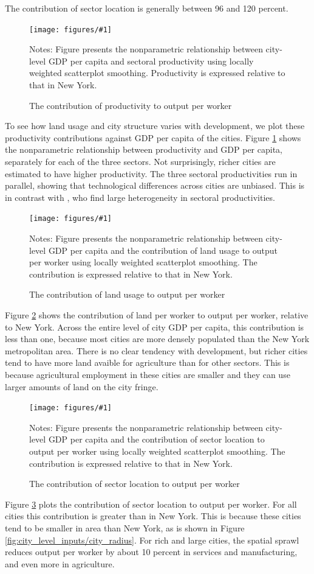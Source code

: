 \documentclass[12pt]{article}
\newcommand{\dofigure}[3]{\begin{figure}
\begin{centering}
\texttt{[image: figures/\#1]}
  \caption{#2\label{fig:#1}}
\end{centering}

\noindent \footnotesize{#3}
\end{figure}}
\begin{document}
The contribution of sector location is generally between 96 and 120 percent.

\dofigure{city_level_inputs/productivity}{The contribution of productivity to output per worker}{Notes: Figure presents the nonparametric relationship between city-level GDP per capita and sectoral productivity using locally weighted scatterplot smoothing. Productivity is expressed relative to that in New York.}

To see how land usage and city structure varies with development, we plot these productivity contributions against GDP per capita of the cities. Figure \ref{fig:city_level_inputs/productivity} shows the nonparametric relationship between productivity and GDP per capita, separately for each of the three sectors. Not surprisingly, richer cities are estimated to have higher productivity. The three sectoral productivities run in parallel, showing that technological differences across cities are unbiased. This is in contrast with , who find large heterogeneity in sectoral productivities.

\dofigure{city_level_inputs/land}{The contribution of land usage to output per worker}{Notes: Figure presents the nonparametric relationship between city-level GDP per capita and the contribution of land usage to output per worker using locally weighted scatterplot smoothing. The contribution is expressed relative to that in New York.}

Figure \ref{fig:city_level_inputs/land} shows the contribution of land per worker to output per worker, relative to New York. Across the entire level of city GDP per capita, this contribution is less than one, because most cities are more densely populated than the New York metropolitan area. There is no clear tendency with development, but richer cities tend to have more land avaible for agriculture than for other sectors. This is because agricultural employment in these cities are smaller and they can use larger amounts of land on the city fringe.

\dofigure{city_level_inputs/location}{The contribution of sector location to output per worker}{Notes: Figure presents the nonparametric relationship between city-level GDP per capita and the contribution of sector location to output per worker using locally weighted scatterplot smoothing. The contribution is expressed relative to that in New York.}

Figure \ref{fig:city_level_inputs/location} plots the contribution of sector location to output per worker. For all cities this contribution is greater than in New York. This is because these cities tend to be smaller in area than New York, as is shown in Figure \ref{fig:city_level_inputs/city_radius}. For rich and large cities, the spatial sprawl reduces output per worker by about 10 percent in services and manufacturing, and even more in agriculture.
\end{document}
